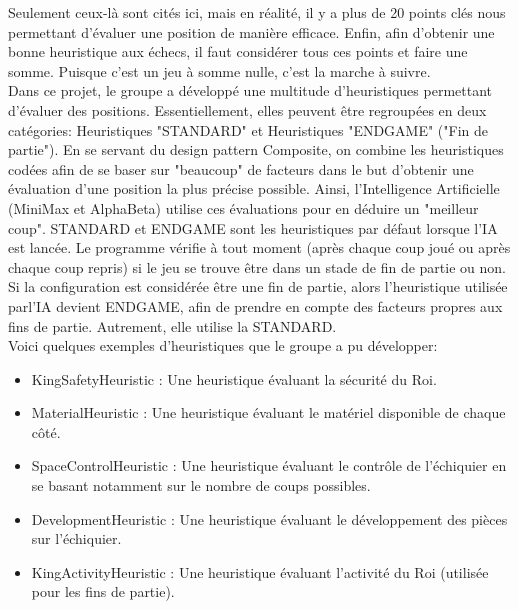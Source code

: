 \documentclass{article}
\begin{document}
Seulement ceux-là sont cités ici, mais en réalité, il y a plus de 20 points clés nous permettant d'évaluer une position de manière efficace.
Enfin, afin d'obtenir une bonne heuristique aux échecs, il faut considérer tous ces points et faire une somme. Puisque c'est un jeu à somme nulle,
c'est la marche à suivre. \\
Dans ce projet, le groupe a développé une multitude d'heuristiques permettant d'évaluer des positions. Essentiellement, elles peuvent être regroupées
en deux catégories: Heuristiques "STANDARD" et Heuristiques "ENDGAME" ("Fin de partie"). En se servant du design pattern Composite, on combine les
heuristiques codées afin de se baser sur "beaucoup" de facteurs dans le but d'obtenir une évaluation d'une position la plus précise possible. Ainsi,
l'Intelligence Artificielle (MiniMax et AlphaBeta) utilise ces évaluations pour en déduire un "meilleur coup". STANDARD et ENDGAME sont les 
heuristiques par défaut lorsque l'IA est lancée. Le programme vérifie à tout moment (après chaque coup joué ou après chaque coup repris)
si le jeu se trouve être dans un stade de fin de partie ou non. Si la configuration est considérée être une fin de partie, alors l'heuristique utilisée
parl'IA devient ENDGAME, afin de prendre en compte des facteurs propres aux fins de partie. Autrement, elle utilise la STANDARD.\\
Voici quelques exemples d'heuristiques que le groupe a pu développer:
\begin{itemize}
    \item KingSafetyHeuristic : Une heuristique évaluant la sécurité du Roi.
    \item MaterialHeuristic : Une heuristique évaluant le matériel disponible de chaque côté.
    \item SpaceControlHeuristic : Une heuristique évaluant le contrôle de l'échiquier en se basant notamment sur le nombre
    de coups possibles.
    \item DevelopmentHeuristic : Une heuristique évaluant le développement des pièces sur l'échiquier.
    \item KingActivityHeuristic : Une heuristique évaluant l'activité du Roi (utilisée pour les fins de partie).
\end{itemize}
\end{document}
